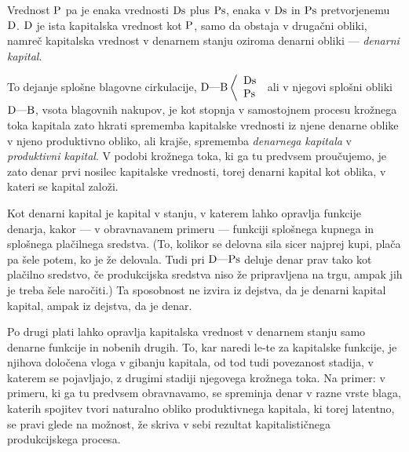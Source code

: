 \documentclass[kapital_02.tex]{subfiles}
\begin{document}
Vrednost \( \textrm{P} \) pa je enaka vrednosti \( \textrm{Ds} \) plus \( \textrm{Ps} \), enaka v \( \textrm{Ds} \) in \( \textrm{Ps} \) pretvorjenemu \( \textrm{D} \). \( \textrm{D} \) je ista kapitalska vrednost kot \( \textrm{P} \), samo da obstaja v drugačni obliki, namreč kapitalska vrednost v denarnem stanju oziroma denarni obliki --- \emph{denarni kapital}.

To dejanje splošne blagovne cirkulacije, \( 
    \textrm{D}\textrm{---}\textrm{B}\left< 
    \begin{array}{l}
        \textrm{Ds}\\
        \textrm{Ps}\\
    \end{array}
    \right. 
\) ali v njegovi splošni obliki \( \textrm{D}\textrm{---}\textrm{B} \), vsota blagovnih nakupov, je kot stopnja v samostojnem procesu krožnega toka kapitala zato hkrati sprememba kapitalske vrednosti iz njene denarne oblike v njeno produktivno obliko, ali krajše, sprememba \emph{denarnega kapitala} v \emph{produktivni kapital}. V podobi krožnega toka, ki ga tu predvsem proučujemo, je zato denar prvi nosilec kapitalske vrednosti, torej denarni kapital kot oblika, v kateri se kapital založi.

Kot denarni kapital je kapital v stanju, v katerem lahko opravlja funkcije denarja, kakor --- v obravnavanem primeru --- funkciji splošnega kupnega in splošnega plačilnega sredstva. (To, kolikor se delovna sila sicer najprej kupi, plača pa šele potem, ko je že delovala. Tudi pri \( \textrm{D}\textrm{---}\textrm{Ps} \) deluje denar prav tako kot plačilno sredstvo, če produkcijska sredstva niso že pripravljena na trgu, ampak jih je treba šele naročiti.) Ta sposobnost ne izvira iz dejstva, da je denarni kapital kapital, ampak iz dejstva, da je denar.

Po drugi plati lahko opravlja kapitalska vrednost v denarnem stanju samo denarne funkcije in nobenih drugih. To, kar naredi le-te za kapitalske funkcije, je njihova določena vloga v gibanju kapitala, od tod tudi povezanost stadija, v katerem se pojavljajo, z drugimi stadiji njegovega krožnega toka. Na primer: v primeru, ki ga tu predvsem obravnavamo, se spreminja denar v razne vrste blaga, katerih spojitev tvori naturalno obliko produktivnega kapitala, ki torej latentno, se pravi glede na možnost, že skriva v sebi rezultat kapitalističnega produkcijskega procesa.
\end{document}
